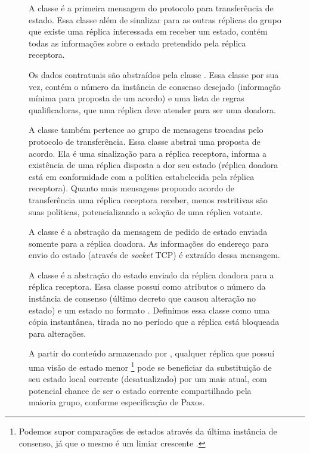 \begin{figure}[ht]
A classe  é a primeira mensagem do protocolo para transferência
de estado. Essa classe além de sinalizar para as outras réplicas do grupo que existe uma
réplica interessada em receber um estado, contém todas as informações sobre o estado
pretendido pela réplica receptora.

Os dados contratuais são abstraídos pela classe . Essa classe por sua
vez, contém o número da instância de consenso desejado (informação mínima para proposta de
um acordo) e uma lista de regras qualificadoras, que uma réplica deve atender para ser uma
doadora.


A classe  também pertence ao grupo de mensagens trocadas pelo
protocolo de transferência. Essa classe abstrai uma proposta de acordo. Ela é uma
sinalização para a réplica receptora, informa a existência de uma réplica disposta a dor
seu estado (réplica doadora está em conformidade com a política estabelecida pela réplica
receptora). Quanto mais mensagens propondo acordo de transferência uma réplica receptora
receber, menos restritivas são suas políticas, potencializando a seleção de uma réplica
votante.


A classe  é a abstração da mensagem de pedido de estado enviada
somente para a réplica doadora. As informações do endereço para envio do estado (através
de \emph{socket} TCP) é extraído dessa mensagem.


A classe  é a abstração do estado enviado da réplica doadora para
a réplica receptora. Essa classe possuí como atributos o número da instância de consenso
(último decreto que causou alteração no estado) e um estado no formato
. Definimos essa classe como uma cópia instantânea, tirada
no no período que a réplica está bloqueada para alterações.

A partir do conteúdo armazenado por , qualquer réplica que possuí
uma visão de estado menor \footnote{Podemos supor comparações de estados através da última
instância de consenso, já que o mesmo é um limiar crescente \cite{vieira-10b}.} pode se
beneficiar da substituição de seu estado local corrente (desatualizado) por um mais atual,
com potencial chance de ser o estado corrente compartilhado pela maioria grupo, conforme
especificação de Paxos.


\end{figure}
